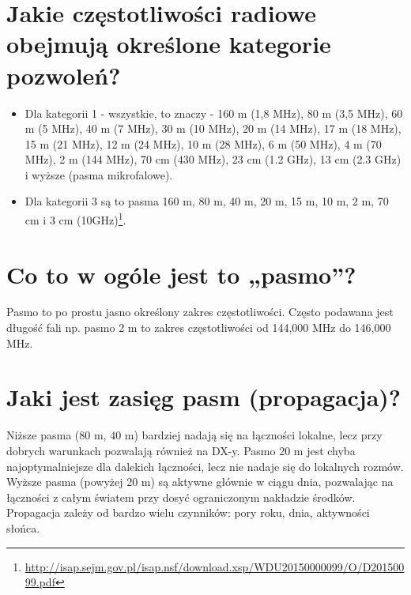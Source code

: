 \documentclass[a4paper,12pt]{article}
\begin{document}
\section{Jakie częstotliwości radiowe obejmują określone kategorie pozwoleń?}
\begin{itemize}
\item Dla kategorii 1 - wszystkie, to znaczy - 160 m (1,8 MHz), 80 m (3,5 MHz), 60 m (5 MHz), 40 m (7 MHz), 30 m (10 MHz), 20 m (14 MHz), 17 m (18 MHz), 15 m (21 MHz), 12 m (24 MHz), 10 m (28 MHz), 6 m (50 MHz), 4 m (70 MHz), 2 m (144 MHz), 70 cm (430 MHz), 23 cm (1.2 GHz), 13 cm (2.3 GHz) i wyższe (pasma mikrofalowe). 
\item Dla kategorii 3 są to pasma 160 m, 80 m, 40 m, 20 m, 15 m, 10 m, 2 m, 70 cm i 3 cm (10GHz)\footnote{\url{http://isap.sejm.gov.pl/isap.nsf/download.xsp/WDU20150000099/O/D20150099.pdf}}.\end{itemize}


\section{Co to w ogóle jest to „pasmo”?}
Pasmo to po prostu jasno określony zakres częstotliwości. Często podawana jest długość fali np. pasmo 2 m to zakres częstotliwości od 144,000 MHz do 146,000 MHz.

\section{Jaki jest zasięg pasm (propagacja)?}
Niższe pasma (80 m, 40 m) bardziej nadają się na łączności lokalne, lecz przy dobrych warunkach pozwalają również na DX-y. Pasmo 20 m jest chyba najoptymalniejsze dla dalekich łączności, lecz nie nadaje się do lokalnych rozmów. Wyższe pasma (powyżej 20 m) są aktywne głównie w ciągu dnia, pozwalając na łączności z całym światem przy dosyć ograniczonym nakładzie środków. Propagacja zależy od bardzo wielu czynników: pory roku, dnia, aktywności słońca. 
\end{document}
